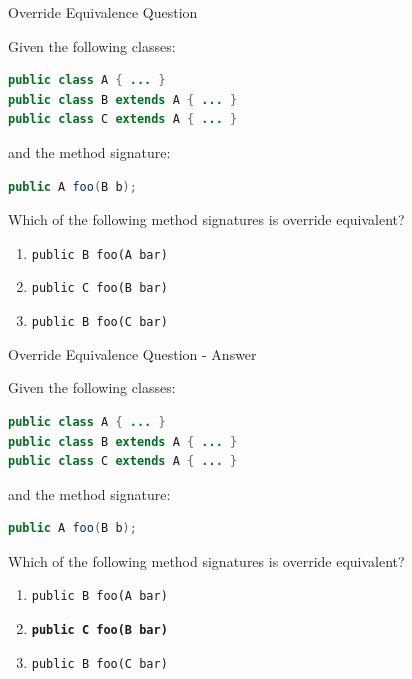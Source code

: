 \documentclass{beamer}
\begin{document}
\begin{frame}[fragile]{Override Equivalence Question}

Given the following classes:

\begin{lstlisting}[language=Java]
public class A { ... }
public class B extends A { ... }
public class C extends A { ... }
\end{lstlisting}

and the method signature:

\begin{lstlisting}[language=Java]
public A foo(B b);
\end{lstlisting}

Which of the following method signatures is override equivalent?

\begin{enumerate}
\item {\tt public B foo(A bar)}
\item {\tt public C foo(B bar)}
\item {\tt public B foo(C bar)}
\end{enumerate}


\end{frame}

\begin{frame}[fragile]{Override Equivalence Question - Answer}

Given the following classes:

\begin{lstlisting}[language=Java]
public class A { ... }
public class B extends A { ... }
public class C extends A { ... }
\end{lstlisting}

and the method signature:

\begin{lstlisting}[language=Java]
public A foo(B b);
\end{lstlisting}

Which of the following method signatures is override equivalent?

\begin{enumerate}
\item {\tt public B foo(A bar)}
\item {\tt {\bf public C foo(B bar)}}
\item {\tt public B foo(C bar)}
\end{enumerate}


\end{frame}







\end{document}

